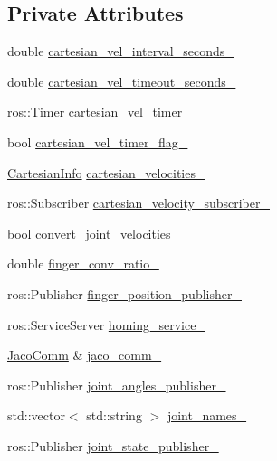 \subsection*{Private Attributes}
\begin{DoxyCompactItemize}
\item 
double \hyperlink{classjaco_1_1JacoArm_aa111ac63977d9a50b7e707b4a9e75e20}{cartesian\+\_\+vel\+\_\+interval\+\_\+seconds\+\_\+}
\item 
double \hyperlink{classjaco_1_1JacoArm_a822ad8d6fcc8719c5a090456998e832a}{cartesian\+\_\+vel\+\_\+timeout\+\_\+seconds\+\_\+}
\item 
ros\+::\+Timer \hyperlink{classjaco_1_1JacoArm_a11e0ed71d6c21e5df7e88fd6ab61df95}{cartesian\+\_\+vel\+\_\+timer\+\_\+}
\item 
bool \hyperlink{classjaco_1_1JacoArm_a17701f668a0b3ea2accf6c5fb420e012}{cartesian\+\_\+vel\+\_\+timer\+\_\+flag\+\_\+}
\item 
\hyperlink{structCartesianInfo}{Cartesian\+Info} \hyperlink{classjaco_1_1JacoArm_a804e6400a10726f2ec0af9ec718bd0cf}{cartesian\+\_\+velocities\+\_\+}
\item 
ros\+::\+Subscriber \hyperlink{classjaco_1_1JacoArm_a7598c2dfaa6677241e490eb42f175a3b}{cartesian\+\_\+velocity\+\_\+subscriber\+\_\+}
\item 
bool \hyperlink{classjaco_1_1JacoArm_a20deb1358ca2385fcf9dca3f0f771409}{convert\+\_\+joint\+\_\+velocities\+\_\+}
\item 
double \hyperlink{classjaco_1_1JacoArm_a45f8b1fbeec4d1abfcad6d3f9e65b6ca}{finger\+\_\+conv\+\_\+ratio\+\_\+}
\item 
ros\+::\+Publisher \hyperlink{classjaco_1_1JacoArm_a323990f9bd26de33240df3f107e29a49}{finger\+\_\+position\+\_\+publisher\+\_\+}
\item 
ros\+::\+Service\+Server \hyperlink{classjaco_1_1JacoArm_af025f6af7b63a3dd5ce18a31b082eec3}{homing\+\_\+service\+\_\+}
\item 
\hyperlink{classjaco_1_1JacoComm}{Jaco\+Comm} \& \hyperlink{classjaco_1_1JacoArm_a2f9cbba855994058b82c0f4628349286}{jaco\+\_\+comm\+\_\+}
\item 
ros\+::\+Publisher \hyperlink{classjaco_1_1JacoArm_a074f24a17f50b88921a9bc9d8e52c09b}{joint\+\_\+angles\+\_\+publisher\+\_\+}
\item 
std\+::vector$<$ std\+::string $>$ \hyperlink{classjaco_1_1JacoArm_a9a6611a10119b2651aa96eb21ecd10ad}{joint\+\_\+names\+\_\+}
\item 
ros\+::\+Publisher \hyperlink{classjaco_1_1JacoArm_a914eb71a6de747a2e63b880b2a0ac0b4}{joint\+\_\+state\+\_\+publisher\+\_\+}

\end{DoxyCompactItemize}
